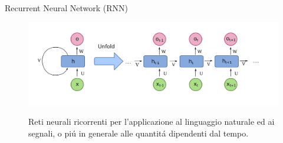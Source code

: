 \documentclass{beamer}
\begin{document}
\begin{frame}{Recurrent Neural Network (RNN)}
    \begin{figure}
        \begin{minipage}{0.7\textwidth}
            \centering
            \includegraphics[width=\textwidth]{architectures/RNN.png}
        \end{minipage}%
        \begin{minipage}{0.3\textwidth}
            \centering
            Reti neurali ricorrenti per l'applicazione al linguaggio naturale ed ai segnali, o pi\'u in generale alle quantit\'a dipendenti dal tempo.
        \end{minipage}
    \end{figure}
\end{frame}
\end{document}
